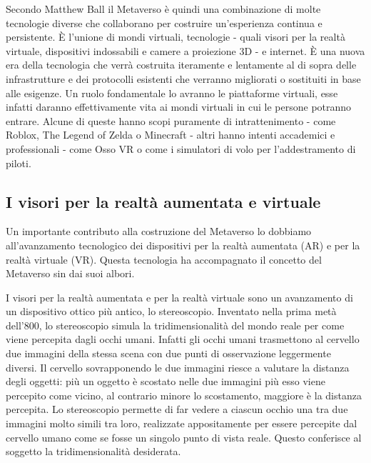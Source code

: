     Secondo Matthew Ball il Metaverso è quindi una combinazione di molte tecnologie diverse che collaborano per costruire un'esperienza continua e persistente.
    È l'unione di mondi virtuali, tecnologie - quali visori per la realtà virtuale, dispositivi indossabili e camere a proiezione 3D - e internet.
    È una nuova era della tecnologia che verrà costruita iteramente e lentamente al di sopra delle infrastrutture e dei protocolli esistenti che verranno migliorati o sostituiti in base alle esigenze.
    Un ruolo fondamentale lo avranno le piattaforme virtuali, esse infatti daranno effettivamente vita ai mondi virtuali in cui le persone potranno entrare.
    Alcune di queste hanno scopi puramente di intrattenimento - come Roblox, The Legend of Zelda o Minecraft - altri hanno intenti accademici e professionali - come Osso VR o come i simulatori di volo per l'addestramento di piloti.


    \subsection{I visori per la realtà aumentata e virtuale} %

        Un importante contributo alla costruzione del Metaverso lo dobbiamo all'avanzamento tecnologico dei dispositivi per la realtà aumentata (AR) e per la realtà virtuale (VR).
        Questa tecnologia ha accompagnato il concetto del Metaverso sin dai suoi albori.

        I visori per la realtà aumentata e per la realtà virtuale sono un avanzamento di un dispositivo ottico più antico, lo stereoscopio. 
        Inventato nella prima metà dell'800, lo stereoscopio simula la tridimensionalità del mondo reale per come viene percepita dagli occhi umani. 
        Infatti gli occhi umani trasmettono al cervello due immagini della stessa scena con due punti di osservazione leggermente diversi.
        Il cervello sovrapponendo le due immagini riesce a valutare la distanza degli oggetti: più un oggetto è scostato nelle due immagini più esso viene percepito come vicino, al contrario minore lo scostamento, maggiore è la distanza percepita.
        Lo stereoscopio permette di far vedere a ciascun occhio una tra due immagini molto simili tra loro, realizzate appositamente per essere percepite dal cervello umano come se fosse un singolo punto di vista reale.
        Questo conferisce al soggetto la tridimensionalità desiderata.

